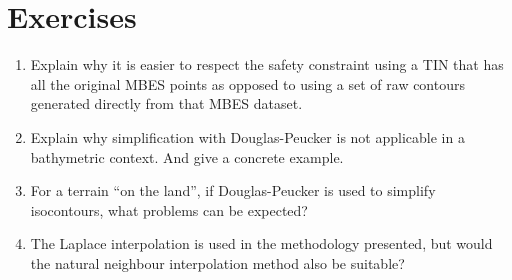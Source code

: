 

%
\section{Exercises}

\begin{enumerate}
  \item Explain why it is easier to respect the safety constraint using a TIN that has all the original MBES points as opposed to using a set of raw contours generated directly from that MBES dataset.
  \item Explain why simplification with Douglas-Peucker is not applicable in a bathymetric context. And give a concrete example.
  \item For a terrain ``on the land'', if Douglas-Peucker is used to simplify isocontours, what problems can be expected?
  \item The Laplace interpolation is used in the methodology presented, but would the natural neighbour interpolation method also be suitable?
\end{enumerate}